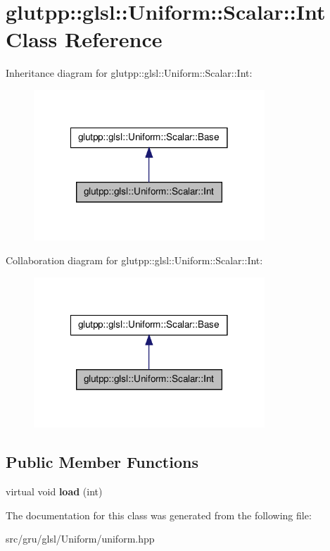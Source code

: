 \hypertarget{classglutpp_1_1glsl_1_1Uniform_1_1Scalar_1_1Int}{\section{glutpp\-:\-:glsl\-:\-:\-Uniform\-:\-:\-Scalar\-:\-:\-Int \-Class \-Reference}
\label{classglutpp_1_1glsl_1_1Uniform_1_1Scalar_1_1Int}
}


\-Inheritance diagram for glutpp\-:\-:glsl\-:\-:\-Uniform\-:\-:\-Scalar\-:\-:\-Int\-:
\nopagebreak
\begin{figure}[H]
\begin{center}
\leavevmode
\includegraphics[width=246pt]{classglutpp_1_1glsl_1_1Uniform_1_1Scalar_1_1Int__inherit__graph}
\end{center}
\end{figure}


\-Collaboration diagram for glutpp\-:\-:glsl\-:\-:\-Uniform\-:\-:\-Scalar\-:\-:\-Int\-:
\nopagebreak
\begin{figure}[H]
\begin{center}
\leavevmode
\includegraphics[width=246pt]{classglutpp_1_1glsl_1_1Uniform_1_1Scalar_1_1Int__coll__graph}
\end{center}
\end{figure}
\subsection*{\-Public \-Member \-Functions}
\begin{DoxyCompactItemize}
\item 
\hypertarget{classglutpp_1_1glsl_1_1Uniform_1_1Scalar_1_1Int_a0c6de8832e03c7a75b8ffb595b894b04}{virtual void {\bfseries load} (int)}\label{classglutpp_1_1glsl_1_1Uniform_1_1Scalar_1_1Int_a0c6de8832e03c7a75b8ffb595b894b04}

\end{DoxyCompactItemize}


\-The documentation for this class was generated from the following file\-:\begin{DoxyCompactItemize}
\item 
src/gru/glsl/\-Uniform/uniform.\-hpp\end{DoxyCompactItemize}
